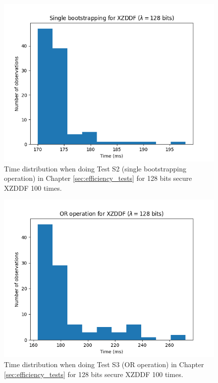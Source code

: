 \begin{figure}[ht]
    \centering
    \includegraphics[width=0.8\linewidth]{data/figures/XZDDF_STD128_Single_bootstrapping.png}
    \caption{Time distribution when doing Test S2 (single bootstrapping operation) in Chapter \ref{sec:efficiency_tests} for 128 bits secure XZDDF 100 times.}
    \label{fig:distr_xzddf128_bs}
\end{figure}

\begin{figure}[ht]
    \centering
    \includegraphics[width=0.8\linewidth]{data/figures/XZDDF_STD128_OR_operation.png}
    \caption{Time distribution when doing Test S3 (OR operation) in Chapter \ref{sec:efficiency_tests} for 128 bits secure XZDDF 100 times.}
    \label{fig:distr_xzddf128_or}
\end{figure}

